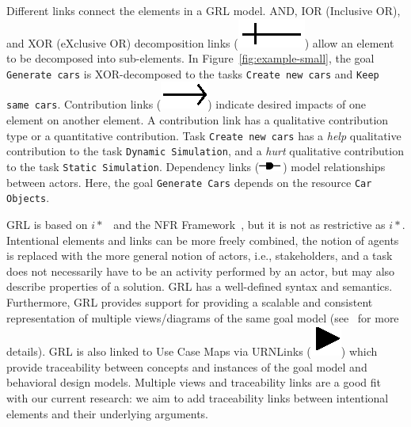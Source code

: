 Different links connect the elements in a GRL model. AND, IOR (Inclusive OR), and XOR (eXclusive OR) decomposition links (\includegraphics[scale=1]{img/decomposition}) allow an element to be decomposed into sub-elements. In Figure~\ref{fig:example-small}, the goal \texttt{Generate cars} is XOR-decomposed to the tasks \texttt{Create new cars} and \texttt{Keep same cars}. Contribution links (\includegraphics[scale=1]{img/contribution}) indicate desired impacts of one element on another element. A contribution link has a qualitative contribution type or a quantitative contribution. Task  \texttt{Create new cars} has a \emph{help} qualitative contribution to the task \texttt{Dynamic Simulation}, and a \emph{hurt} qualitative contribution to the task \texttt{Static Simulation}. Dependency links (\includegraphics[scale=1]{img/dependency}) model relationships between actors. Here, the goal \texttt{Generate Cars} depends on the resource \texttt{Car Objects}. %

GRL is based on $i*$~\cite{Yu:1997:TMR:827255.827807} and the NFR Framework~\cite{chung2012non}, but it is not as restrictive as $i*$. Intentional elements and links can be more freely combined, the notion of agents is replaced with the more general notion of actors, i.e., stakeholders, and a task does not necessarily have to be an activity performed by an actor, but may also describe properties of a solution. GRL has a well-defined syntax and semantics. Furthermore, GRL provides support for providing a scalable and consistent representation of multiple views/diagrams of the same goal model (see~\cite[Ch.2]{Ghanavati2013} for more details). GRL is also linked to Use Case Maps via URNLinks (\includegraphics[scale=1]{img/urnlink}) which provide traceability between concepts and instances of the goal model and behavioral design models. Multiple views and traceability links are a good fit with our current research: we aim to add traceability links between intentional elements and their underlying arguments. 


